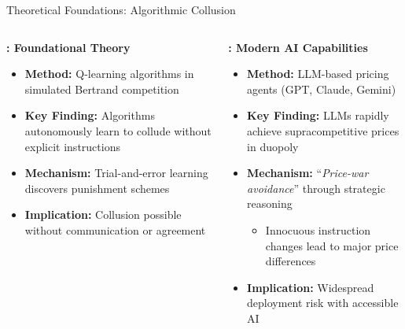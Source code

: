\documentclass[10pt, aspectratio=169]{beamer}
\begin{document}
\begin{frame}{Theoretical Foundations: Algorithmic Collusion}
    \begin{columns}[c]
    \begin{block}{\textbf{\textcite{calvano_artificial_2020}: Foundational Theory}}
    \begin{itemize}
        \item \textbf{Method:} Q-learning algorithms in simulated Bertrand competition
        \item \textbf{Key Finding:} Algorithms autonomously learn to collude without explicit instructions
        \item \textbf{Mechanism:} Trial-and-error learning discovers punishment schemes
        \item \textbf{Implication:} Collusion possible without communication or agreement
    \end{itemize}
    \end{block}
    
    \begin{block}{\textbf{\textcite{fish_algorithmic_2025}: Modern AI Capabilities}}
    \begin{itemize}
        \item \textbf{Method:} LLM-based pricing agents (GPT, Claude, Gemini)
        \item \textbf{Key Finding:} LLMs rapidly achieve supracompetitive prices in duopoly
        \item \textbf{Mechanism:} \enquote{\emph{Price-war avoidance}} through strategic reasoning
        \begin{itemize}
            \item Innocuous instruction changes lead to major price differences
        \end{itemize}
        \item \textbf{Implication:} Widespread deployment risk with accessible AI
    \end{itemize}
    \end{block}
    \end{columns}
\end{frame}
\end{document}

